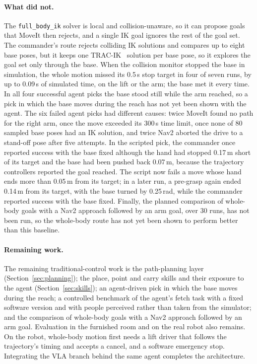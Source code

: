 \documentclass[12pt,a4paper]{article}
\begin{document}
\paragraph{What did not.}
The \texttt{full\_body\_ik} solver is local and collision-unaware, so it can propose goals that
MoveIt then rejects, and a single IK goal ignores the rest of the goal set. The commander's route
rejects colliding IK solutions and compares up to eight base poses, but it keeps one
TRAC-IK~\cite{tracik} solution per base pose, so it explores the goal set only through the base.
When the collision monitor stopped the base in simulation, the whole motion missed its 0.5\,s stop
target in four of seven runs, by up to 0.09\,s of simulated time, on the lift or the arm; the base
met it every time. In all four successful agent picks the base stood still while the arm reached, so
a pick in which the base moves during the reach has not yet been shown with the agent. The six failed
agent picks had different causes: twice MoveIt found no path for the right arm, once the move
exceeded its 300\,s time limit, once none of 80 sampled base poses had an IK solution, and twice Nav2
aborted the drive to a stand-off pose after five attempts. In the scripted pick, the commander once
reported success with the base fixed although the hand had stopped 0.17\,m short of its target and
the base had been pushed back 0.07\,m, because the trajectory controllers reported the goal reached.
The script now fails a move whose hand ends more than 0.05\,m from its target; in a later run, a
pre-grasp again ended 0.14\,m from its target, with the base turned by 0.25\,rad, while the commander
reported success with the base fixed. Finally, the planned comparison of whole-body goals with a Nav2
approach followed by an arm goal, over 30 runs, has not been run, so the whole-body route has not yet
been shown to perform better than this baseline.

\paragraph{Remaining work.}
The remaining traditional-control work is the path-planning layer (Section~\ref{sec:planning}); the
place, point and carry skills and their exposure to the agent (Section~\ref{sec:skills}); an agent-driven pick in
which the base moves during the reach; a controlled benchmark of the agent's fetch task with a fixed
software version and with people perceived rather than taken from the simulator; and the comparison
of whole-body goals with a Nav2 approach followed by an arm goal. Evaluation in the furnished room and
on the real robot also remains. On the robot, whole-body motion first needs a lift driver that
follows the trajectory's timing and accepts a cancel, and a software emergency stop. Integrating the
VLA branch behind the same agent completes the architecture.
\end{document}

